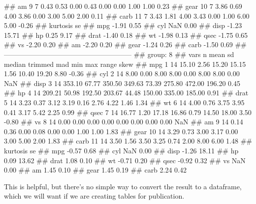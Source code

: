\documentclass[]{article}
\newenvironment{Shaded}{\begin{snugshade}}{\end{snugshade}}
\newcommand{\NormalTok}[1]{#1}
\theoremstyle{definition}
\theoremstyle{definition}
\theoremstyle{definition}
\theoremstyle{remark}
\begin{document}
\begin{Shaded}
\begin{Highlighting}[]
\NormalTok{## am      9 7   0.43  0.53   0.00    0.43  0.00   0.00   1.00   1.00  0.23}
\NormalTok{## gear   10 7   3.86  0.69   4.00    3.86  0.00   3.00   5.00   2.00  0.11}
\NormalTok{## carb   11 7   3.43  1.81   4.00    3.43  0.00   1.00   6.00   5.00 -0.26}
\NormalTok{##      kurtosis    se}
\NormalTok{## mpg     -1.91  0.55}
\NormalTok{## cyl       NaN  0.00}
\NormalTok{## disp    -1.23 15.71}
\NormalTok{## hp       0.25  9.17}
\NormalTok{## drat    -1.40  0.18}
\NormalTok{## wt      -1.98  0.13}
\NormalTok{## qsec    -1.75  0.65}
\NormalTok{## vs      -2.20  0.20}
\NormalTok{## am      -2.20  0.20}
\NormalTok{## gear    -1.24  0.26}
\NormalTok{## carb    -1.50  0.69}
\NormalTok{## -------------------------------------------------------- }
\NormalTok{## group: 8}
\NormalTok{##      vars  n   mean    sd median trimmed   mad    min    max  range  skew}
\NormalTok{## mpg     1 14  15.10  2.56  15.20   15.15  1.56  10.40  19.20   8.80 -0.36}
\NormalTok{## cyl     2 14   8.00  0.00   8.00    8.00  0.00   8.00   8.00   0.00   NaN}
\NormalTok{## disp    3 14 353.10 67.77 350.50  349.63 73.39 275.80 472.00 196.20  0.45}
\NormalTok{## hp      4 14 209.21 50.98 192.50  203.67 44.48 150.00 335.00 185.00  0.91}
\NormalTok{## drat    5 14   3.23  0.37   3.12    3.19  0.16   2.76   4.22   1.46  1.34}
\NormalTok{## wt      6 14   4.00  0.76   3.75    3.95  0.41   3.17   5.42   2.25  0.99}
\NormalTok{## qsec    7 14  16.77  1.20  17.18   16.86  0.79  14.50  18.00   3.50 -0.80}
\NormalTok{## vs      8 14   0.00  0.00   0.00    0.00  0.00   0.00   0.00   0.00   NaN}
\NormalTok{## am      9 14   0.14  0.36   0.00    0.08  0.00   0.00   1.00   1.00  1.83}
\NormalTok{## gear   10 14   3.29  0.73   3.00    3.17  0.00   3.00   5.00   2.00  1.83}
\NormalTok{## carb   11 14   3.50  1.56   3.50    3.25  0.74   2.00   8.00   6.00  1.48}
\NormalTok{##      kurtosis    se}
\NormalTok{## mpg     -0.57  0.68}
\NormalTok{## cyl       NaN  0.00}
\NormalTok{## disp    -1.26 18.11}
\NormalTok{## hp       0.09 13.62}
\NormalTok{## drat     1.08  0.10}
\NormalTok{## wt      -0.71  0.20}
\NormalTok{## qsec    -0.92  0.32}
\NormalTok{## vs        NaN  0.00}
\NormalTok{## am       1.45  0.10}
\NormalTok{## gear     1.45  0.19}
\NormalTok{## carb     2.24  0.42}
\end{Highlighting}
\end{Shaded}

This is helpful, but there's no simple way to convert the result to a
dataframe, which we will want if we are creating tables for publication.
\end{document}
